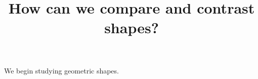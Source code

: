 \documentclass{ximera}
\title{How can we compare and contrast shapes?}
\begin{document}
\begin{abstract}
\end{abstract}
\maketitle

We begin studying geometric shapes.
\end{document}
